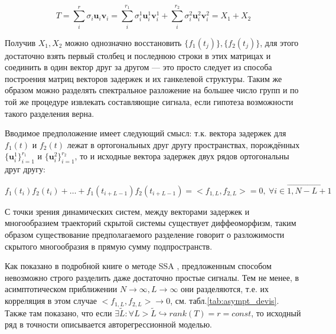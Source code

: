 	    	\begin{equation*}
	    		 T = \sum\limits_i^{r} \sigma_i \mathbf{u}_i \mathbf{v}_i = \sum\limits_i^{r_1} \sigma_i^1 \mathbf{u}_i^1 \mathbf{v}_i^1 + \sum\limits_i^{r_2} \sigma_i^2 \mathbf{u}_i^2 \mathbf{v}_i^2 = X_1 + X_2
	    	\end{equation*}
	    	
	    	Получив $ X_1, X_2 $ можно однозначно восстановить $ \{f_1(t_j)\}, \{f_2(t_j)\} $, для этого достаточно взять первый столбец и последнюю строки в этих матрицах и соединить в один вектор друг за другом --- это просто следует из способа построения матриц векторов задержек и их ганкелевой структуры. Таким же образом можно разделять спектральное разложение на большее число групп и по той же процедуре извлекать составляющие сигнала, если гипотеза возможности такого разделения верна.
	    	
	    	Вводимое предположение имеет следующий смысл: т.к. вектора задержек для $ f_1(t) $ и $ f_2(t) $ лежат в ортогональных друг другу пространствах, порождённых $ \{\mathbf{u}^1_i\}_{i=1}^{r_1} $ и $ \{\mathbf{u}^2_i\}_{i=1}^{r_2} $, то и исходные вектора задержек двух рядов ортогональны друг другу:
	    	
	    	\[
	    		 f_1(t_i) f_2(t_i) + \ldots + f_1(t_{i + L - 1}) f_2(t_{i + L - 1}) = <f_{1, L}, f_{2, L}> = 0, \  \forall i \in \overrightarrow{1, N - L + 1}
	    	\]
	    	
	    	 С точки зрения динамических систем, между векторами задержек и многообразием траекторий скрытой системы существует диффеоморфизм, таким образом существование предполагаемого разделение говорит о разложимости скрытого многообразия в прямую сумму подпространств.
	    	
	    	Как показано в подробной книге о методе SSA \cite{ecfb9dc578be43ae9ee8fc88b8ff9151}, предложенным способом невозможно строго разделить даже достаточно простые сигналы. Тем не менее, в асимптотическом приближении $ N \to \infty, L \to \infty $ они разделяются, т.е. их корреляция в этом случае $ <f_{1, L}, f_{2, L}> \to 0 $, см. табл.\ref{tab:asympt_devis}. Также там показано, что если $ \exists \tilde{L}: \forall L > \tilde{L} \hookrightarrow rank(T) = r = const $, то исходный ряд в точности описывается авторегрессионной моделью.
	    	
